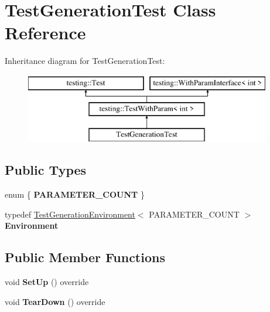 \hypertarget{classTestGenerationTest}{}\section{Test\+Generation\+Test Class Reference}
\label{classTestGenerationTest}
Inheritance diagram for Test\+Generation\+Test\+:\begin{figure}[H]
\begin{center}
\leavevmode
\includegraphics[height=3.000000cm]{classTestGenerationTest}
\end{center}
\end{figure}
\subsection*{Public Types}
\begin{DoxyCompactItemize}
\item 
\mbox{\label{classTestGenerationTest_a76accab0cd1a7e2449e74d019320a28b}} 
enum \{ {\bfseries P\+A\+R\+A\+M\+E\+T\+E\+R\+\_\+\+C\+O\+U\+NT}
 \}
\item 
\mbox{\label{classTestGenerationTest_aeff004d79bbb376d7acecd28f9fb71c6}} 
typedef \mbox{\hyperlink{classTestGenerationEnvironment}{Test\+Generation\+Environment}}$<$ P\+A\+R\+A\+M\+E\+T\+E\+R\+\_\+\+C\+O\+U\+NT $>$ {\bfseries Environment}
\end{DoxyCompactItemize}
\subsection*{Public Member Functions}
\begin{DoxyCompactItemize}
\item 
\mbox{\label{classTestGenerationTest_a06cbce86435733a568824f9641ea57c2}} 
void {\bfseries Set\+Up} () override
\item 
\mbox{\label{classTestGenerationTest_a7e6a732f786fe5b2d989c11c51eb9fe1}} 
void {\bfseries Tear\+Down} () override
\end{DoxyCompactItemize}
